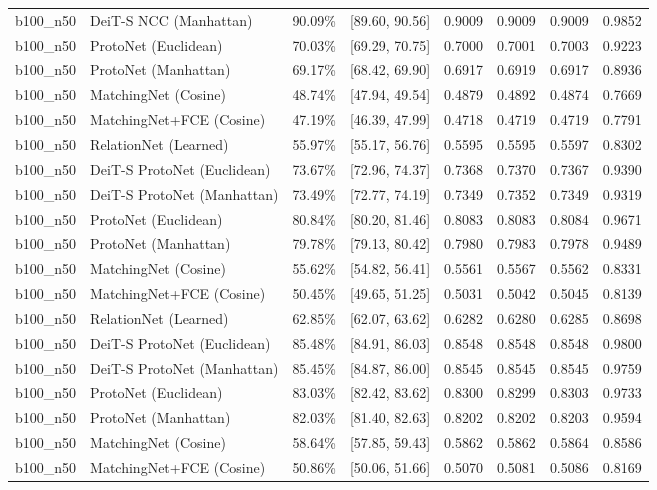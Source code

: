 \begin{table}[htbp]
\begin{tabular}{lllccccc}
b100\_n50 & DeiT-S NCC (Manhattan) & 90.09\% & [89.60, 90.56] & 0.9009 & 0.9009 & 0.9009 & 0.9852 \\
b100\_n50 & ProtoNet (Euclidean) & 70.03\% & [69.29, 70.75] & 0.7000 & 0.7001 & 0.7003 & 0.9223 \\
b100\_n50 & ProtoNet (Manhattan) & 69.17\% & [68.42, 69.90] & 0.6917 & 0.6919 & 0.6917 & 0.8936 \\
b100\_n50 & MatchingNet (Cosine) & 48.74\% & [47.94, 49.54] & 0.4879 & 0.4892 & 0.4874 & 0.7669 \\
b100\_n50 & MatchingNet+FCE (Cosine) & 47.19\% & [46.39, 47.99] & 0.4718 & 0.4719 & 0.4719 & 0.7791 \\
b100\_n50 & RelationNet (Learned) & 55.97\% & [55.17, 56.76] & 0.5595 & 0.5595 & 0.5597 & 0.8302 \\
b100\_n50 & DeiT-S ProtoNet (Euclidean) & 73.67\% & [72.96, 74.37] & 0.7368 & 0.7370 & 0.7367 & 0.9390 \\
b100\_n50 & DeiT-S ProtoNet (Manhattan) & 73.49\% & [72.77, 74.19] & 0.7349 & 0.7352 & 0.7349 & 0.9319 \\
b100\_n50 & ProtoNet (Euclidean) & 80.84\% & [80.20, 81.46] & 0.8083 & 0.8083 & 0.8084 & 0.9671 \\
b100\_n50 & ProtoNet (Manhattan) & 79.78\% & [79.13, 80.42] & 0.7980 & 0.7983 & 0.7978 & 0.9489 \\
b100\_n50 & MatchingNet (Cosine) & 55.62\% & [54.82, 56.41] & 0.5561 & 0.5567 & 0.5562 & 0.8331 \\
b100\_n50 & MatchingNet+FCE (Cosine) & 50.45\% & [49.65, 51.25] & 0.5031 & 0.5042 & 0.5045 & 0.8139 \\
b100\_n50 & RelationNet (Learned) & 62.85\% & [62.07, 63.62] & 0.6282 & 0.6280 & 0.6285 & 0.8698 \\
b100\_n50 & DeiT-S ProtoNet (Euclidean) & 85.48\% & [84.91, 86.03] & 0.8548 & 0.8548 & 0.8548 & 0.9800 \\
b100\_n50 & DeiT-S ProtoNet (Manhattan) & 85.45\% & [84.87, 86.00] & 0.8545 & 0.8545 & 0.8545 & 0.9759 \\
b100\_n50 & ProtoNet (Euclidean) & 83.03\% & [82.42, 83.62] & 0.8300 & 0.8299 & 0.8303 & 0.9733 \\
b100\_n50 & ProtoNet (Manhattan) & 82.03\% & [81.40, 82.63] & 0.8202 & 0.8202 & 0.8203 & 0.9594 \\
b100\_n50 & MatchingNet (Cosine) & 58.64\% & [57.85, 59.43] & 0.5862 & 0.5862 & 0.5864 & 0.8586 \\
b100\_n50 & MatchingNet+FCE (Cosine) & 50.86\% & [50.06, 51.66] & 0.5070 & 0.5081 & 0.5086 & 0.8169 \\

\end{tabular}
\end{table}
